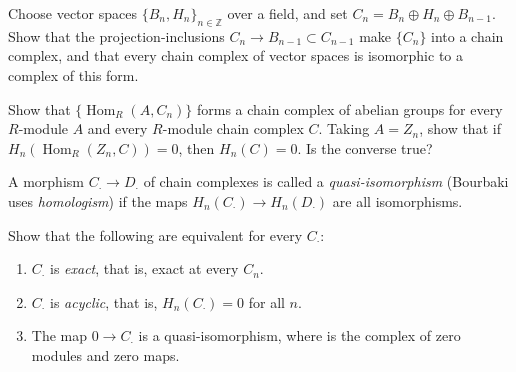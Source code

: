 \begin{exercise}
  Choose vector spaces $\{B_n, H_n\}_{n \in \mathbb{Z}}$ over a field, and set $C_n = B_n \oplus H_n \oplus B_{n - 1}$. Show that the projection-inclusions $C_n \to B_{n - 1} \subset C_{n - 1}$ make $\{C_n\}$ into a chain complex, and that every chain complex of vector spaces is isomorphic to a complex of this form.
\end{exercise}

\begin{exercise}
  Show that $\{\operatorname{Hom}_R(A, C_n)\}$ forms a chain complex of abelian groups for every $R$-module $A$ and every $R$-module chain complex $C$. Taking $A = Z_n$, show that if $H_n(\operatorname{Hom}_R(Z_n, C)) = 0$, then $H_n(C) = 0$. Is the converse true?
\end{exercise}

\begin{definition}
  A morphism $C_\cdot \to D_\cdot$ of chain complexes is called a \emph{quasi-isomorphism} (Bourbaki uses \emph{homologism}) if the maps $H_n(C_\cdot) \to H_n(D_\cdot)$ are all isomorphisms.
\end{definition}

\begin{exercise}
  Show that the following are equivalent for every $C_\cdot$:
  \begin{enumerate}
    \item $C_\cdot$ is \emph{exact}, that is, exact at every $C_n$.
    \item $C_\cdot$ is \emph{acyclic}, that is, $H_n(C_\cdot) = 0$ for all $n$.
    \item The map $0 \to C_\cdot$ is a quasi-isomorphism, where  is the complex of zero modules and zero maps.
  \end{enumerate}
\end{exercise}
